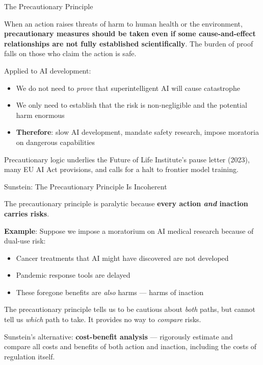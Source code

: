 \documentclass[aspectratio=169,11pt]{beamer}
\begin{document}
\begin{frame}[shrink=5]{The Precautionary Principle}
\begin{conceptbox}
When an action raises threats of harm to human health or the environment, \textbf{precautionary measures should be taken even if some cause-and-effect relationships are not fully established scientifically}. The burden of proof falls on those who claim the action is safe.
\end{conceptbox}

\vspace{0.2cm}
Applied to AI development:
\begin{itemize}
    \item We do not need to \emph{prove} that superintelligent AI will cause catastrophe
    \item We only need to establish that the risk is non-negligible and the potential harm enormous
    \item \textbf{Therefore}: slow AI development, mandate safety research, impose moratoria on dangerous capabilities
\end{itemize}

\vspace{0.2cm}
Precautionary logic underlies the Future of Life Institute's pause letter (2023), many EU AI Act provisions, and calls for a halt to frontier model training.
\end{frame}

\begin{frame}[shrink=14]{Sunstein: The Precautionary Principle Is Incoherent}
\begin{objectionbox}
The precautionary principle is paralytic because \textbf{every action \emph{and} inaction carries risks}.
\vspace{0.1cm}

\textbf{Example}: Suppose we impose a moratorium on AI medical research because of dual-use risk:
\begin{itemize}
    \item Cancer treatments that AI might have discovered are not developed
    \item Pandemic response tools are delayed
    \item These foregone benefits are \emph{also} harms --- harms of inaction
\end{itemize}
The precautionary principle tells us to be cautious about \emph{both} paths, but cannot tell us \emph{which} path to take. It provides no way to \emph{compare} risks.
\end{objectionbox}

\vspace{0.15cm}
Sunstein's alternative: \textbf{cost-benefit analysis} --- rigorously estimate and compare all costs and benefits of both action and inaction, including the costs of regulation itself.

\parencite{sunstein_laws_of_fear_2005}
\end{frame}
\end{document}
